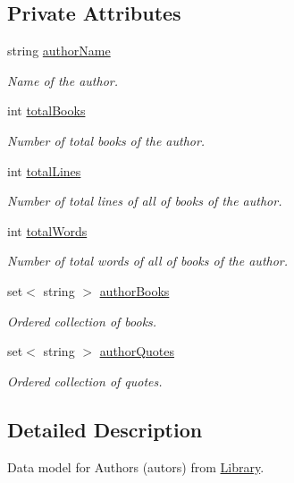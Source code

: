 \subsection*{Private Attributes}
\begin{DoxyCompactItemize}
\item 
string \hyperlink{class_author_a146b76b89d701097c36fb5d29df27bc4}{author\+Name}
\begin{DoxyCompactList}\small\item\em Name of the author. \end{DoxyCompactList}\item 
int \hyperlink{class_author_ac870b8c861aa0f69cd2c4e7b8d414902}{total\+Books}
\begin{DoxyCompactList}\small\item\em Number of total books of the author. \end{DoxyCompactList}\item 
int \hyperlink{class_author_a8d818414bbd909287641b388601bf61a}{total\+Lines}
\begin{DoxyCompactList}\small\item\em Number of total lines of all of books of the author. \end{DoxyCompactList}\item 
int \hyperlink{class_author_a478c72fff965eb1ee8fcaddfe173715b}{total\+Words}
\begin{DoxyCompactList}\small\item\em Number of total words of all of books of the author. \end{DoxyCompactList}\item 
set$<$ string $>$ \hyperlink{class_author_ad9ffe450cdafed2242936f6fcafa22b4}{author\+Books}
\begin{DoxyCompactList}\small\item\em Ordered collection of books. \end{DoxyCompactList}\item 
set$<$ string $>$ \hyperlink{class_author_ad505d991f439d28c4831828952e01fb6}{author\+Quotes}
\begin{DoxyCompactList}\small\item\em Ordered collection of quotes. \end{DoxyCompactList}\end{DoxyCompactItemize}


\subsection{Detailed Description}
Data model for Authors (autors) from \hyperlink{class_library}{Library}. 

